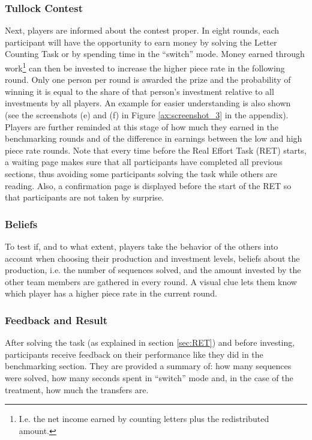     \subsubsection{Tullock Contest}
    
    Next, players are informed about the contest proper. In eight rounds, each participant will have the opportunity to earn money by solving the Letter Counting Task or by spending time in the ``switch'' mode. Money earned through work\footnote{I.e. the net income earned by counting letters plus the redistributed amount.} can then be invested to increase the higher piece rate in the following round. Only one person per round is awarded the prize and the probability of winning it is equal to the share of that person's investment relative to all investments by all players. An example for easier understanding is also shown (see the screenshots (e) and (f) in Figure \ref{ax:screenshot_3} in the appendix).\\
    
    Players are further reminded at this stage of how much they earned in the benchmarking rounds and of the difference in earnings between the low and high piece rate rounds. Note that every time before the Real Effort Task (RET) starts, a waiting page makes sure that all participants have completed all previous sections, thus avoiding some participants solving the task while others are reading. Also, a confirmation page is displayed before the start of the RET so that participants are not taken by surprise.
   
    \subsubsection{Beliefs}
    
    To test if, and to what extent, players take the behavior of the others into account when choosing their production and investment levels, beliefs about the production, i.e. the number of sequences solved, and the amount invested by the other team members are gathered in every round. A visual clue lets them know which player has a higher piece rate in the current round.
    
    \subsubsection{Feedback and Result}
    
    After solving the task (as explained in section \ref{sec:RET}) and before investing, participants receive feedback on their performance like they did in the benchmarking section. They are provided a summary of: how many sequences were solved, how many seconds spent in ``switch'' mode and, in the case of the treatment, how much the transfers are.\\
    
